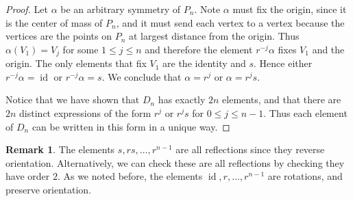 \documentclass[12pt]{report}
\numberwithin{equation}{section}
\numberwithin{theorem}{chapter}
\theoremstyle{definition}
\newtheorem*{basic properties}{Basic Properties}
\newtheorem*{Important Remark}{Important Remark}
\newtheorem{remark}[theorem]{Remark}
\DeclareMathOperator{\id}{id}
\begin{document}
\begin{proof}
Let $\alpha$ be an arbitrary symmetry of $P_n$. Note $\alpha$ must fix the origin, since it is the center of mass of $P_n$, and it must send each vertex to a vertex because the vertices are the points on $P_n$ at largest distance from the origin.
Thus $\alpha(V_1) = V_ j$ for some $1 \leqslant j \leqslant n$ and therefore the element $r^{-j}\alpha$ fixes $V_1$ and the origin. The only elements that fix $V_1$ are the identity and $s$. Hence either $r^{-j}\alpha = \id$ or $r^{-j}\alpha = s$. We conclude that $\alpha = r^j$ or $\alpha = r^js$.

Notice that we have shown that $D_n$ has exactly $2n$ elements, and that there are $2n$ distinct expressions of the form $r^j$ or $r^js$ for $0 \leqslant j \leqslant n-1$. Thus each element of $D_n$ can be written in this form in a unique way.
\end{proof}



\begin{remark}
The elements $s, rs, \dots, r^{n-1}$ are all reflections since they reverse
  orientation. Alternatively, we can check these are all reflections by checking they have order $2$. As we noted before, the elements $\id, r, \dots, r^{n-1}$ are rotations, and preserve orientation.
\end{remark}
\end{document}
